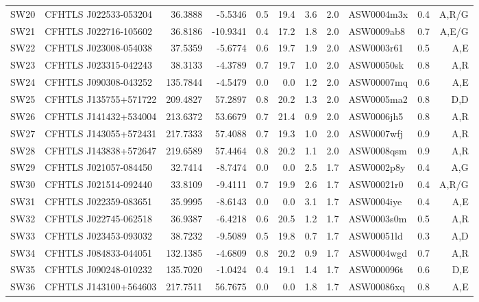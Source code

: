 \documentclass[useAMS,usenatbib,a4paper]{mn2e}
\begin{document}
\begin{center}
\begin{longtable}{llrrrrrrlrr}
SW20 & CFHTLS J022533-053204 &   36.3888 &   -5.5346 &  0.5 & 19.4 &  3.6 &  2.0 & ASW0004m3x &  0.4  &  A,R/G   \\
SW21 & CFHTLS J022716-105602 &   36.8186 &  -10.9341 &  0.4 & 17.2 &  1.8 &  2.0 & ASW0009ab8 &  0.7  &  A,E/G   \\
SW22 & CFHTLS J023008-054038 &   37.5359 &   -5.6774 &  0.6 & 19.7 &  1.9 &  2.0 & ASW0003r61 &  0.5  &  A,E   \\
SW23 & CFHTLS J023315-042243 &   38.3133 &   -4.3789 &  0.7 & 19.7 &  1.0 &  2.0 & ASW00050sk &  0.8  &  A,R   \\
SW24 & CFHTLS J090308-043252 &  135.7844 &   -4.5479 &  0.0 &  0.0 &  1.2 &  2.0 & ASW00007mq &  0.6  &  A,E   \\
SW25 & CFHTLS J135755+571722 &  209.4827 &   57.2897 &  0.8 & 20.2 &  1.3 &  2.0 & ASW0005ma2 &  0.8  &  D,D   \\
SW26 & CFHTLS J141432+534004 &  213.6372 &   53.6679 &  0.7 & 21.4 &  0.9 &  2.0 & ASW0006jh5 &  0.8  &  A,R   \\
SW27 & CFHTLS J143055+572431 &  217.7333 &   57.4088 &  0.7 & 19.3 &  1.0 &  2.0 & ASW0007wfj &  0.9  &  A,R   \\
SW28 & CFHTLS J143838+572647 &  219.6589 &   57.4464 &  0.8 & 20.2 &  1.1 &  2.0 & ASW0008qsm &  0.9  &  A,R   \\
SW29 & CFHTLS J021057-084450 &   32.7414 &   -8.7474 &  0.0 &  0.0 &  2.5 &  1.7 & ASW0002p8y &  0.4  &  A,G   \\
SW30 & CFHTLS J021514-092440 &   33.8109 &   -9.4111 &  0.7 & 19.9 &  2.6 &  1.7 & ASW00021r0 &  0.4  &  A,R/G   \\
SW31 & CFHTLS J022359-083651 &   35.9995 &   -8.6143 &  0.0 &  0.0 &  3.1 &  1.7 & ASW0004iye &  0.4  &  A,E   \\
SW32 & CFHTLS J022745-062518 &   36.9387 &   -6.4218 &  0.6 & 20.5 &  1.2 &  1.7 & ASW0003s0m &  0.5  &  A,R   \\
SW33 & CFHTLS J023453-093032 &   38.7232 &   -9.5089 &  0.5 & 19.8 &  0.7 &  1.7 & ASW00051ld &  0.3  &  A,D   \\
SW34 & CFHTLS J084833-044051 &  132.1385 &   -4.6809 &  0.8 & 20.2 &  0.9 &  1.7 & ASW0004wgd &  0.7  &  A,R   \\
SW35 & CFHTLS J090248-010232 &  135.7020 &   -1.0424 &  0.4 & 19.1 &  1.4 &  1.7 & ASW000096t &  0.6  &  D,E   \\
SW36 & CFHTLS J143100+564603 &  217.7511 &   56.7675 &  0.0 &  0.0 &  1.8 &  1.7 & ASW00086xq &  0.8  &  A,E   \\

\end{longtable}
\end{center}
\end{document}

